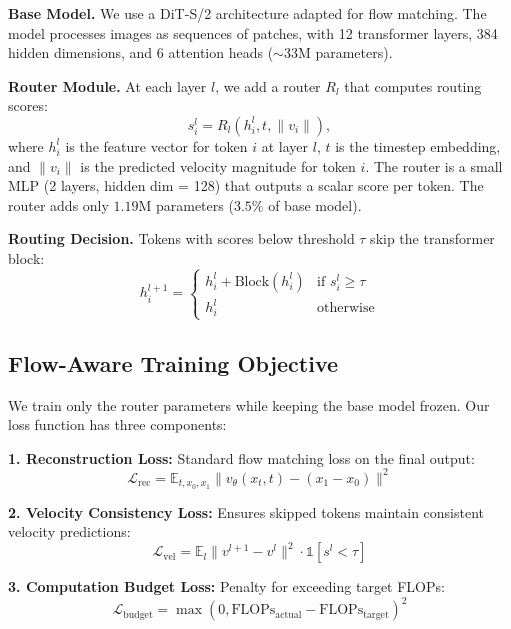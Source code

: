 \documentclass{article}
\begin{document}
\textbf{Base Model.} We use a DiT-S/2 architecture adapted for flow matching. The model processes images as sequences of patches, with 12 transformer layers, 384 hidden dimensions, and 6 attention heads ($\sim$33M parameters).

\textbf{Router Module.} At each layer $l$, we add a router $R_l$ that computes routing scores:
\begin{equation}
s_i^l = R_l(h_i^l, t, \|v_i\|),
\end{equation}
where $h_i^l$ is the feature vector for token $i$ at layer $l$, $t$ is the timestep embedding, and $\|v_i\|$ is the predicted velocity magnitude for token $i$. The router is a small MLP (2 layers, hidden dim = 128) that outputs a scalar score per token. The router adds only $1.19$M parameters ($3.5\%$ of base model).

\textbf{Routing Decision.} Tokens with scores below threshold $\tau$ skip the transformer block:
\begin{equation}
h_i^{l+1} = \begin{cases} h_i^l + \text{Block}(h_i^l) & \text{if } s_i^l \geq \tau \\ h_i^l & \text{otherwise} \end{cases}
\end{equation}

\subsection{Flow-Aware Training Objective}

We train only the router parameters while keeping the base model frozen. Our loss function has three components:

\textbf{1. Reconstruction Loss:} Standard flow matching loss on the final output:
\begin{equation}
\mathcal{L}_{\text{rec}} = \mathbb{E}_{t, x_0, x_1} \|v_\theta(x_t, t) - (x_1 - x_0)\|^2
\end{equation}

\textbf{2. Velocity Consistency Loss:} Ensures skipped tokens maintain consistent velocity predictions:
\begin{equation}
\mathcal{L}_{\text{vel}} = \mathbb{E}_{l} \|v^{l+1} - v^l\|^2 \cdot \mathbb{1}[s^l < \tau]
\end{equation}

\textbf{3. Computation Budget Loss:} Penalty for exceeding target FLOPs:
\begin{equation}
\mathcal{L}_{\text{budget}} = \max(0, \text{FLOPs}_{\text{actual}} - \text{FLOPs}_{\text{target}})^2
\end{equation}
\end{document}
